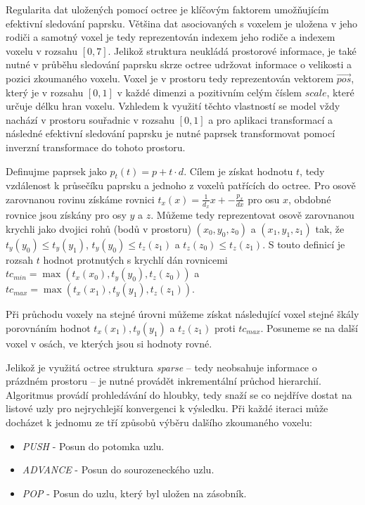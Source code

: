 Regularita dat uložených pomocí octree je klíčovým faktorem umožňujícím efektivní sledování paprsku. Většina dat asociovaných s voxelem je uložena v jeho rodiči a samotný voxel je tedy reprezentován indexem jeho rodiče a indexem voxelu v rozsahu $[0, 7]$. Jelikož struktura neukládá prostorové informace, je také nutné v průběhu sledování paprsku skrze octree udržovat informace o velikosti a pozici zkoumaného voxelu. Voxel je v prostoru tedy reprezentován vektorem $\vec{pos}$, který je v rozsahu $[0, 1]$ v každé dimenzi a pozitivním celým číslem $scale$, které určuje délku hran voxelu. Vzhledem k využití těchto vlastností se model vždy nachází v prostoru souřadnic v rozsahu $[0, 1]$ a pro aplikaci transformací a následné efektivní sledování paprsku je nutné paprsek transformovat pomocí inverzní transformace do tohoto prostoru.

Definujme paprsek jako $p_t(t) = p + t\cdot d$. Cílem je získat hodnotu $t$, tedy vzdálenost k průsečíku paprsku a jednoho z voxelů patřících do octree. Pro osově zarovnanou rovinu získáme rovnici $t_x(x) = \frac{1}{d_x}x + -\frac{p_x}{dx}$ pro osu $x$, obdobné rovnice jsou získány pro osy $y$ a $z$. Můžeme tedy reprezentovat osově zarovnanou krychli jako dvojici rohů (bodů v prostoru) $(x_0, y_0, z_0)$ a $(x_1, y_1, z_1)$ tak, že $t_y(y_0) \leq t_y(y_1)$, $t_y(y_0) \leq t_z(z_1)$ a $t_z(z_0) \leq t_z(z_1)$. S touto definicí je rozsah $t$ hodnot protnutých s krychlí dán rovnicemi $tc_{min} = \max(t_x(x_0), t_y(y_0), t_z(z_0))$ a $tc_{max} = \max(t_x(x_1), t_y(y_1), t_z(z_1))$.

Při průchodu voxely na stejné úrovni můžeme získat následující voxel stejné škály porovnáním hodnot $t_x(x_1), t_y(y_1)$ a $t_z(z_1)$ proti $tc_{max}$. Posuneme se na další voxel v osách, ve kterých jsou si hodnoty rovné.

Jelikož je využitá octree struktura \textit{sparse} -- tedy neobsahuje informace o prázdném prostoru -- je nutné provádět inkrementální průchod hierarchií. Algoritmus provádí prohledávání do hloubky, tedy snaží se co nejdříve dostat na listové uzly pro nejrychlejší konvergenci k výsledku. Při každé iteraci může docházet k jednomu ze tří způsobů výběru dalšího zkoumaného voxelu:

\begin{itemize}
    \item \textit{PUSH} - Posun do potomka uzlu.
    \item \textit{ADVANCE} - Posun do sourozeneckého uzlu.
    \item \textit{POP} - Posun do uzlu, který byl uložen na zásobník.
\end{itemize}

